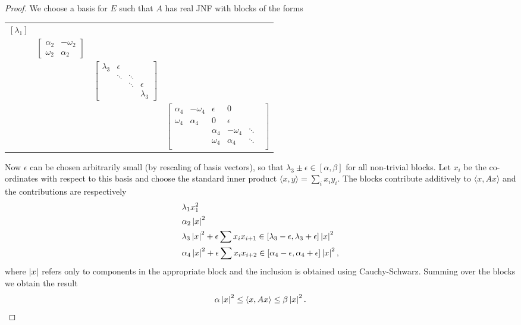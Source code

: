 \documentclass{notes}
\theoremstyle{plain}
\begin{document}
\begin{proof}
We choose a basis for $E$ such that $A$ has real JNF with blocks of the forms
\begin{center}
\begin{tabular}{c c c c}
$\left[ \lambda_1 \right]$ \\
& $\left[ \begin{matrix}
\alpha_2 & -\omega_2 \\ \omega_2 & \alpha_2
\end{matrix} \right] $\\
& & $\left[
\begin{matrix}
\lambda_3 & \epsilon & & \\
          & \ddots   & \ddots  & \\
          &          & \ddots & \epsilon \\
          &          &        & \lambda_3         
\end{matrix}
\right]$ \\
& & & $\left[
\begin{matrix}
\alpha_4 & -\omega_4 & \epsilon & 0 & & \\
\omega_4 & \alpha_4 & 0 & \epsilon \\
         &          & \alpha_4 & -\omega_4 & \ddots \\
         &          & \omega_4 & \alpha_4 & \ddots \\
\end{matrix}
\right]$
\end{tabular}
\end{center}

Now $\epsilon$ can be chosen arbitrarily small (by rescaling of basis vectors),
so that $\lambda_3 \pm \epsilon \in [ \alpha, \beta ]$ for all non-trivial
blocks.  Let $x_i$ be the co-ordinates with respect to this basis and choose
the standard inner product $\langle x,y \rangle = \sum_i x_i y_i$.  The
blocks contribute additively to $\langle x, Ax \rangle$ and the contributions
are respectively
\begin{align*}
&\lambda_1 x_1^2 \\
&\alpha_2 \left|x\right|^2 \\
&\lambda_3 \left|x\right|^2 + \epsilon \sum x_i x_{i+1} \in [\lambda_3 - \epsilon,
\lambda_3 + \epsilon ] \left|x\right|^2 \\
&\alpha_4 \left|x\right|^2 + \epsilon \sum x_i x_{i+2} \in [\alpha_4 - \epsilon,
\alpha_4 + \epsilon ] \left|x\right|^2,
\end{align*}
where $\left|x\right|$ refers only to components in the appropriate block and the
inclusion is obtained using Cauchy-Schwarz.  Summing over the blocks we obtain
the result
\[
\alpha \left|x\right|^2 \le \langle x, Ax \rangle \le \beta \left|x\right|^2.
\]
\end{proof}
\end{document}
